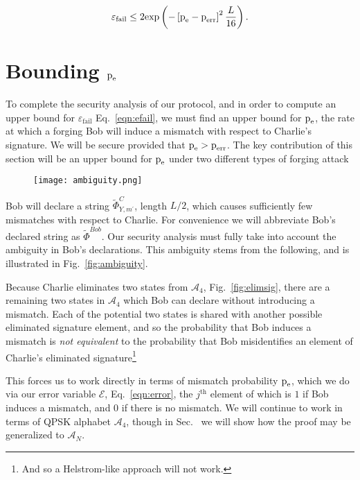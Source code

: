 \begin{equation}\label{eqn:efail}
\varepsilon_{\text{fail}} \le 2 \text{exp}\left( - \left[\text{p}_{\text{e}} - \text{p}_{\text{err}}\right]^2 \frac{L}{16}\right).
\end{equation}

\section{Bounding $\text{p}_{\text{e}}$}
To complete the security analysis of our protocol, and in order to compute an upper bound for $\varepsilon_{\text{fail}}$ Eq.~\ref{eqn:efail}, we must find an upper bound for $\text{p}_{\text{e}}$, the rate at which a forging Bob will induce a mismatch with respect to Charlie's signature. We will be secure provided that $\text{p}_{\text{e}} > \text{p}_{\text{err}}$. The key contribution of this section will be an upper bound for $\text{p}_{\text{e}}$ under two different types of forging attack



\begin{figure}[htp]
\centering
\texttt{[image: ambiguity.png]}
\end{figure}

Bob will declare a string $\tilde{\Phi}_{Y, m^\prime}^C$, length $L/2$,  which causes sufficiently few mismatches with respect to Charlie. For convenience we will abbreviate Bob's declared string as $\tilde{\Phi}^{Bob}$. Our security analysis must fully take into account the ambiguity in Bob's declarations. This ambiguity stems from the following, and is illustrated in Fig.~\ref{fig:ambiguity}.

Because Charlie eliminates two states from $\mathcal{A}_4$, Fig.~\ref{fig:elimsig}, there are a remaining two states in $\mathcal{A}_4$ which Bob can declare without introducing a mismatch. Each of the potential two states is shared with another possible eliminated signature element, and so the probability that Bob induces a mismatch is \emph{not equivalent} to the probability that Bob misidentifies an element of Charlie's eliminated signature\footnote{And so a Helstrom-like approach  will not work.}

This forces us to work directly in terms of mismatch probability $\text{p}_{\text{e}}$, which we do via our error variable $\mathcal{E}$, Eq.~\ref{eqn:error}, the $j^{\text{th}}$ element of which is $1$ if Bob induces a mismatch, and $0$ if there is no mismatch. We will continue to work in terms of QPSK alphabet $\mathcal{A}_4$, though in Sec.~ we will show how the proof may be generalized to $\mathcal{A}_N$.

